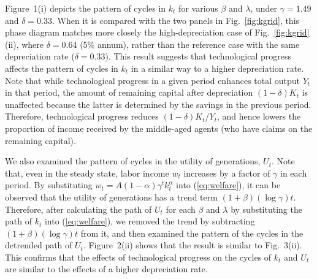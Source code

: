 \documentclass[nogrid]{MBE}%
\begin{document}
{Figure~1(i) depicts the pattern of cycles in $k_{t}$ for various $\beta$ and $\lambda$, under
$\gamma=1.49$ and $\delta=0.33$. When it is compared with the two panels in Fig.\ \ref{fig:kgrid},
this phase diagram matches more closely the high-depreciation case of Fig.\ \ref{fig:kgrid}(ii),
where $\delta=0.64$ (5\% annum), rather than the reference case with the same depreciation rate
($\delta=0.33$). This result suggests that technological progress affects the pattern of cycles in
$k_{t}$ in a similar way to a higher depreciation rate. Note that while technological progress in
a given period enhances total output $Y_{t}$ in that period, the amount of remaining capital after
depreciation $(1-\delta)K_{t}$ is unaffected because the latter is determined by the savings in
the previous period. Therefore, technological progress reduces $(1-\delta)K_{t}/Y_{t}$, and hence
lowers the proportion of income received by the middle-aged agents (who have claims on the
remaining capital).


We also examined the pattern of cycles in the utility of generations, $U_{t}$. Note that, even in
the steady state, labor income $w_{t}$ increases by a factor of $\gamma$ in each period. By
substituting $w_{t}=A(1-\alpha )\gamma^{t} k_{t}^{\alpha}$ into (\ref{eq:welfare}), it can be
observed that the utility of generations has a trend term $(1+\beta)(\log\gamma)t$. Therefore,
after calculating the path of $U_{t}$ for each $\beta$ and $\lambda$ by substituting the path of
$k_{t}$ into (\ref{eq:welfare}), we removed the trend by subtracting $(1+\beta)(\log\gamma)t$ from
it, and then examined the pattern of the cycles in the detrended path of $U_{t}$. Figure~2(ii)
shows that the result is similar to Fig.~3(ii). This confirms that the effects of technological
progress on the cycles of $k_{t}$ and $U_{t}$ are similar to the effects of a higher depreciation
rate.

}
\end{document}
